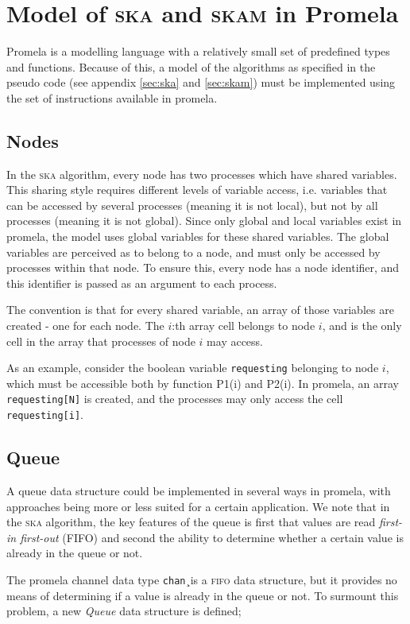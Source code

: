 \documentclass[a4paper,10pt]{llncs}
\begin{document}
\section{Model of \textsc{ska} and \textsc{skam} in Promela}
Promela is a modelling language with a relatively small set of predefined types and functions. Because of this, a model of the algorithms as specified in the pseudo code (see appendix \ref{sec:ska} and \ref{sec:skam}) must be implemented using the set of instructions available in promela.


\subsection{Nodes}
In the \textsc{ska} algorithm, every node has two processes which have shared variables. This sharing style requires different levels of variable access, i.e. variables that can be accessed by several processes (meaning it is not local), but not by all processes (meaning it is not global). Since only global and local variables exist in promela, the model uses global variables for these shared variables. The global variables are perceived as to belong to a node, and must only be accessed by processes within that node. To ensure this, every node has a node identifier, and this identifier is passed as an argument to each process. 

The convention is that for every shared variable, an array of those variables are created - one for each node. The $i$:th array cell belongs to node $i$, and is the only cell in the array that processes of node $i$ may access.

As an example, consider the boolean variable \texttt{requesting} belonging to node $i$, which must be accessible both by function P1(i) and P2(i). In promela, an array \texttt{requesting[N]} is created, and the processes may only access the cell \texttt{requesting[i]}.

\subsection{Queue}
A queue data structure could be implemented in several ways in promela, with approaches being more or less suited for a certain application. We note that in the \textsc{ska} algorithm, the key features of the queue is first that values are read \emph{first-in first-out} (FIFO) and second the ability to determine whether a certain value is already in the queue or not.

The promela channel data type \texttt{chan}¸is a \textsc{fifo} data structure, but it provides no means of determining if a value is already in the queue or not. To surmount this problem, a new \emph{Queue} data structure is defined;
\end{document}
